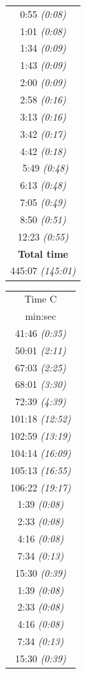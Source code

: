\documentclass{ieeeaccess}
\begin{document}
\begin{table}[ht]
\begin{tabular}{c}
0:55 \textit{(0:08)} \\ 1:01 \textit{(0:08)}  \\ 1:34 \textit{(0:09)} \\ 1:43 \textit{(0:09)} \\ 2:00 \textit{(0:09)}  \\ 2:58 \textit{(0:16)}\\ 3:13 \textit{(0:16)} \\3:42 \textit{(0:17)}  \\ 4:42 \textit{(0:18)}  \\\ 5:49 \textit{(0:48)}\\ 6:13 \textit{(0:48)} \\ 7:05 \textit{(0:49)}  \\ 8:50 \textit{(0:51)}  \\ 12:23 \textit{(0:55)}  \\
\midrule
\textbf{Total time} \\ 
445:07 \textit{(145:01)} \\ \bottomrule
\end{tabular}%
\begin{tabular}{c}
\toprule
Time C\\
min:sec\\ \midrule
41:46 \textit{(0:35) } \\50:01 \textit{(2:11)} \\ 67:03 \textit{(2:25)} \\ 68:01 \textit{(3:30) } \\ 72:39 \textit{(4:39)}  \\ 101:18 \textit{(12:52)} \\ 102:59 \textit{(13:19)}  \\ 104:14 \textit{(16:09)}\\ 105:13 \textit{(16:55)}   \\106:22 \textit{(19:17)}\\ 
1:39 \textit{(0:08) } \\ 2:33 \textit{(0:08)} \\ 4:16 \textit{(0:08)}  \\7:34 \textit{(0:13)} \\ 15:30 \textit{(0:39)}  \\ 
1:39 \textit{(0:08) } \\ 2:33 \textit{(0:08)} \\ 4:16 \textit{(0:08)}  \\7:34 \textit{(0:13)} \\ 15:30 \textit{(0:39)}  \\ 

\end{tabular}
\end{table}
\end{document}
